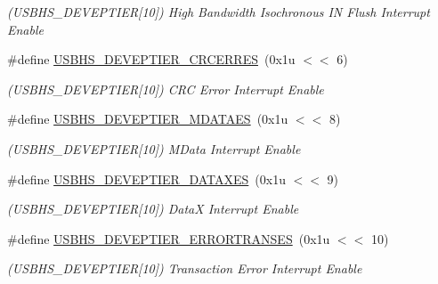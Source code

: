 \begin{DoxyCompactItemize}
\begin{DoxyCompactList}\small\item\em (U\+S\+B\+H\+S\+\_\+\+D\+E\+V\+E\+P\+T\+I\+ER\mbox{[}10\mbox{]}) High Bandwidth Isochronous IN Flush Interrupt Enable \end{DoxyCompactList}\item 
\mbox{\label{group__SAME70__USBHS_ga07e37d9a679da1fba5def79ccf2a498e}} 
\#define \mbox{\hyperlink{group__SAME70__USBHS_ga07e37d9a679da1fba5def79ccf2a498e}{U\+S\+B\+H\+S\+\_\+\+D\+E\+V\+E\+P\+T\+I\+E\+R\+\_\+\+C\+R\+C\+E\+R\+R\+ES}}~(0x1u $<$$<$ 6)
\begin{DoxyCompactList}\small\item\em (U\+S\+B\+H\+S\+\_\+\+D\+E\+V\+E\+P\+T\+I\+ER\mbox{[}10\mbox{]}) C\+RC Error Interrupt Enable \end{DoxyCompactList}\item 
\mbox{\label{group__SAME70__USBHS_ga4fbb7b3cdc6a6fd2701ace359856cee9}} 
\#define \mbox{\hyperlink{group__SAME70__USBHS_ga4fbb7b3cdc6a6fd2701ace359856cee9}{U\+S\+B\+H\+S\+\_\+\+D\+E\+V\+E\+P\+T\+I\+E\+R\+\_\+\+M\+D\+A\+T\+A\+ES}}~(0x1u $<$$<$ 8)
\begin{DoxyCompactList}\small\item\em (U\+S\+B\+H\+S\+\_\+\+D\+E\+V\+E\+P\+T\+I\+ER\mbox{[}10\mbox{]}) M\+Data Interrupt Enable \end{DoxyCompactList}\item 
\mbox{\label{group__SAME70__USBHS_ga0162e1889ef91809937c8e0bd91d1a68}} 
\#define \mbox{\hyperlink{group__SAME70__USBHS_ga0162e1889ef91809937c8e0bd91d1a68}{U\+S\+B\+H\+S\+\_\+\+D\+E\+V\+E\+P\+T\+I\+E\+R\+\_\+\+D\+A\+T\+A\+X\+ES}}~(0x1u $<$$<$ 9)
\begin{DoxyCompactList}\small\item\em (U\+S\+B\+H\+S\+\_\+\+D\+E\+V\+E\+P\+T\+I\+ER\mbox{[}10\mbox{]}) DataX Interrupt Enable \end{DoxyCompactList}\item 
\mbox{\label{group__SAME70__USBHS_gab8a4312a4fef51e62f9bc659228378e2}} 
\#define \mbox{\hyperlink{group__SAME70__USBHS_gab8a4312a4fef51e62f9bc659228378e2}{U\+S\+B\+H\+S\+\_\+\+D\+E\+V\+E\+P\+T\+I\+E\+R\+\_\+\+E\+R\+R\+O\+R\+T\+R\+A\+N\+S\+ES}}~(0x1u $<$$<$ 10)
\begin{DoxyCompactList}\small\item\em (U\+S\+B\+H\+S\+\_\+\+D\+E\+V\+E\+P\+T\+I\+ER\mbox{[}10\mbox{]}) Transaction Error Interrupt Enable \end{DoxyCompactList}\item 

\end{DoxyCompactItemize}
